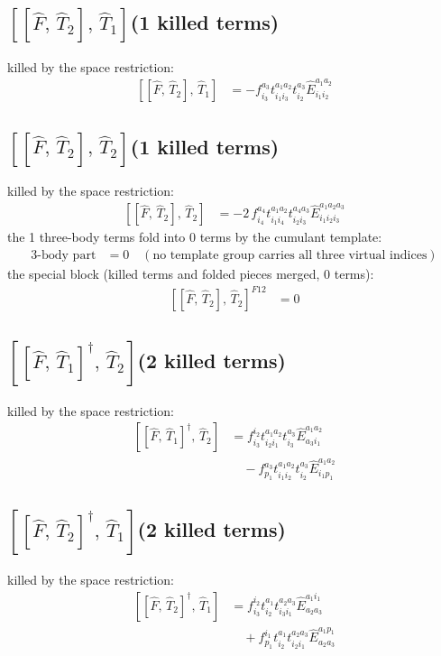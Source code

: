 \documentclass[11pt]{article}
\begin{document}
\subsection*{$\left[\left[\hat{F},\, \hat{T}_{2}\right],\, \hat{T}_{1}\right]$\quad(1 killed terms)}
killed by the space restriction:
\begin{align}
\left[\left[\hat{F},\, \hat{T}_{2}\right],\, \hat{T}_{1}\right] &= - f^{a_{3}}_{i_{3}} t^{a_{1}a_{2}}_{i_{1}i_{3}} t^{a_{3}}_{i_{2}} \hat{E}^{a_{1}a_{2}}_{i_{1}i_{2}}
\end{align}
\subsection*{$\left[\left[\hat{F},\, \hat{T}_{2}\right],\, \hat{T}_{2}\right]$\quad(1 killed terms)}
killed by the space restriction:
\begin{align}
\left[\left[\hat{F},\, \hat{T}_{2}\right],\, \hat{T}_{2}\right] &= - 2\, f^{a_{4}}_{i_{4}} t^{a_{1}a_{2}}_{i_{1}i_{4}} t^{a_{4}a_{3}}_{i_{2}i_{3}} \hat{E}^{a_{1}a_{2}a_{3}}_{i_{1}i_{2}i_{3}}
\end{align}
the 1 three-body terms fold into 0 terms by the cumulant template:
\begin{align}
3\text{-body part} &= 0 \quad (\text{no template group carries all three virtual indices})
\end{align}
the special block (killed terms and folded pieces merged, 0 terms):
\begin{align}
\left[\left[\hat{F},\, \hat{T}_{2}\right],\, \hat{T}_{2}\right]^{F12} &= 0
\end{align}
\subsection*{$\left[\left[\hat{F},\, \hat{T}_{1}\right]^{\dagger},\, \hat{T}_{2}\right]$\quad(2 killed terms)}
killed by the space restriction:
\begin{align}
\left[\left[\hat{F},\, \hat{T}_{1}\right]^{\dagger},\, \hat{T}_{2}\right] &= f^{i_{2}}_{i_{3}} t^{a_{1}a_{2}}_{i_{2}i_{1}} t^{a_{3}}_{i_{3}} \hat{E}^{a_{1}a_{2}}_{a_{3}i_{1}} \\
&\quad - f^{a_{3}}_{p_{1}} t^{a_{1}a_{2}}_{i_{1}i_{2}} t^{a_{3}}_{i_{2}} \hat{E}^{a_{1}a_{2}}_{i_{1}p_{1}}
\end{align}
\subsection*{$\left[\left[\hat{F},\, \hat{T}_{2}\right]^{\dagger},\, \hat{T}_{1}\right]$\quad(2 killed terms)}
killed by the space restriction:
\begin{align}
\left[\left[\hat{F},\, \hat{T}_{2}\right]^{\dagger},\, \hat{T}_{1}\right] &= f^{i_{2}}_{i_{3}} t^{a_{1}}_{i_{2}} t^{a_{2}a_{3}}_{i_{3}i_{1}} \hat{E}^{a_{1}i_{1}}_{a_{2}a_{3}} \\
&\quad + f^{i_{1}}_{p_{1}} t^{a_{1}}_{i_{2}} t^{a_{2}a_{3}}_{i_{2}i_{1}} \hat{E}^{a_{1}p_{1}}_{a_{2}a_{3}}
\end{align}
\end{document}
